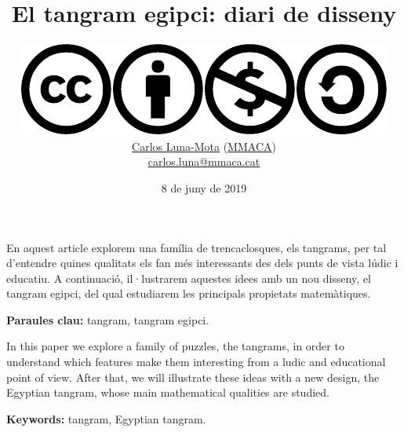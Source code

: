 \documentclass[a4paper,11pt]{article}
\begin{document}

    \title{El tangram egipci: diari de disseny}
    \author{\href{https://creativecommons.org/licenses/by-nc-sa/4.0/}{\includegraphics[scale=0.15]{cc/cc.pdf}\includegraphics[scale=0.15]{cc/by.pdf}\includegraphics[scale=0.15]{cc/nc.pdf}\includegraphics[scale=0.15]{cc/sa.pdf}}
    \href{https://github.com/CarlosLunaMota}{Carlos Luna-Mota} (\href{https://mmaca.cat/}{MMACA})\\ \href{mailto:carlos.luna@mmaca.cat}{carlos.luna@mmaca.cat}}
    \date{8 de juny de 2019}
    \maketitle

    \begin{multicols}{2}
        En aquest article explorem una família de trencaclosques, els tangrams, per tal d'entendre quines qualitats els fan més interessants des dels punts de vista lúdic i educatiu. A continuació, il·lustrarem aquestes idees amb un nou disseny, el tangram egipci, del qual estudiarem les principals propietats matemàtiques.

        \textbf{Paraules clau:} tangram, tangram egipci.

        \columnbreak

        In this paper we explore a family of puzzles, the tangrams, in order to understand which features make them interesting from a ludic and educational point of view. After that, we will illustrate these ideas with a new design, the Egyptian tangram, whose main mathematical qualities are studied.

        \textbf{Keywords:} tangram, Egyptian tangram.
    \end{multicols}
\end{document}
